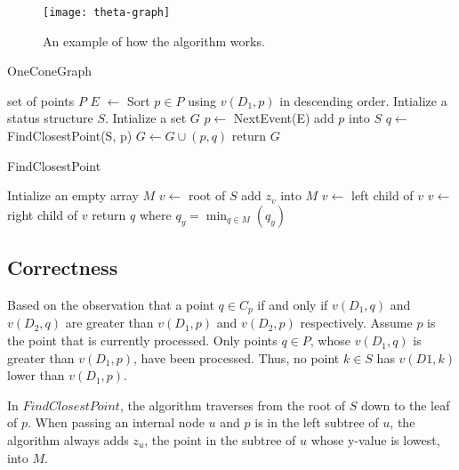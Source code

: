 \documentclass[12pt]{article}
\begin{document}
\begin{center}
    \label{figure1}
    \begin{figure}[h]
    \centering
    \texttt{[image: theta-graph]}\\
    \caption{An example of how the algorithm works.} \label{fig:theta-graph}
    \end{figure}
\end{center}

\begin{algorithm}[h]
  \caption{OneConeGraph}
  \begin{algorithmic}
    \Require set of points $P$
    \State $E$ $\leftarrow$ Sort $p \in P$ using $v(D_1,p)$ in descending order.
    \State Intialize a status structure $S$.
    \State Intialize a set $G$
        \State $p \leftarrow$ NextEvent(E)
        \State add $p$ into $S$
        \State $q \leftarrow$ FindClosestPoint(S, p)
        \State $G \leftarrow G \cup { (p,q) }$
    \EndWhile
    \State return $G$
  \end{algorithmic}
\end{algorithm}

\begin{algorithm}[h]
  \caption{FindClosestPoint}
  \begin{algorithmic}
    \State Intialize an empty array $M$
    \State $v \leftarrow$ root of $S$
            \State add $z_v$ into $M$
            \State $v \leftarrow$ left child of $v$
        \Else
            \State $v \leftarrow$ right child of $v$
        \EndIf
    \EndWhile
    \State return $q$ where $q_y = \min_{q \in M} (q_y)$
  \end{algorithmic}
\end{algorithm}

\subsection*{Correctness}
Based on the observation that a point $q \in C_p$ if and only if $v(D_1,q)$ and $v(D_2,q)$
are greater than $v(D_1,p)$ and $v(D_2,p)$ respectively. Assume $p$ is the point that 
is currently processed. Only points $q \in P$, whose $v(D_1,q)$ is greater than $v(D_1,p)$,
have been processed. Thus, no point $k \in S$ has $v(D1,k)$ lower than $v(D_1,p)$.

In $FindClosestPoint$, the algorithm traverses from the root of $S$ down to the leaf
of $p$. When passing an internal node $u$ and $p$ is in the left subtree of $u$,
the algorithm always adds $z_u$, the point in the subtree of $u$  whose y-value is lowest, into $M$.
\end{document}
